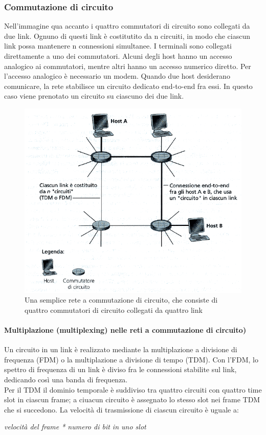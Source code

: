 \documentclass[11pt,a4paper]{article}
\begin{document}
\subsubsection{Commutazione di circuito}
Nell’immagine qua accanto i quattro commutatori di circuito sono collegati da due link. Ognuno di questi link è costitutito da n circuiti, in modo che ciascun link possa mantenere n connessioni simultanee.
I terminali sono collegati direttamente a uno dei commutatori. Alcuni degli host hanno un accesso analogico ai commutatori, mentre altri hanno un accesso numerico diretto. Per l’accesso analogico è necessario un modem. Quando due host desiderano comunicare, la rete stabilisce un circuito dedicato end-to-end fra essi. In questo caso viene prenotato un circuito su ciascuno dei due link.
\begin{figure}
	\begin{center}
		\includegraphics[scale=0.6]{img/002.png}
		\caption{Una semplice rete a commutazione di circuito, che consiste di quattro commutatori di circuito collegati da quattro link}
	\end{center}
\end{figure}
\paragraph{Multiplazione (multiplexing) nelle reti a commutazione di circuito)}
Un circuito in un link è realizzato mediante la multiplazione a divisione di frequenza (FDM) o la multiplazione a divisione di tempo (TDM).
Con l’FDM, lo spettro di frequenza di un link è diviso fra le connessioni stabilite sul link, dedicando così una banda di frequenza. \\
Per il TDM il dominio temporale è suddiviso tra quattro circuiti con quattro time slot in ciascun frame; a ciuacun circuito è assegnato lo stesso slot nei frame TDM che si succedono. La velocità di trasmissione di ciascun circuito è uguale a:
\begin{center}
	\textit{velocità del frame * numero di bit in uno slot}
\end{center}
\end{document}
